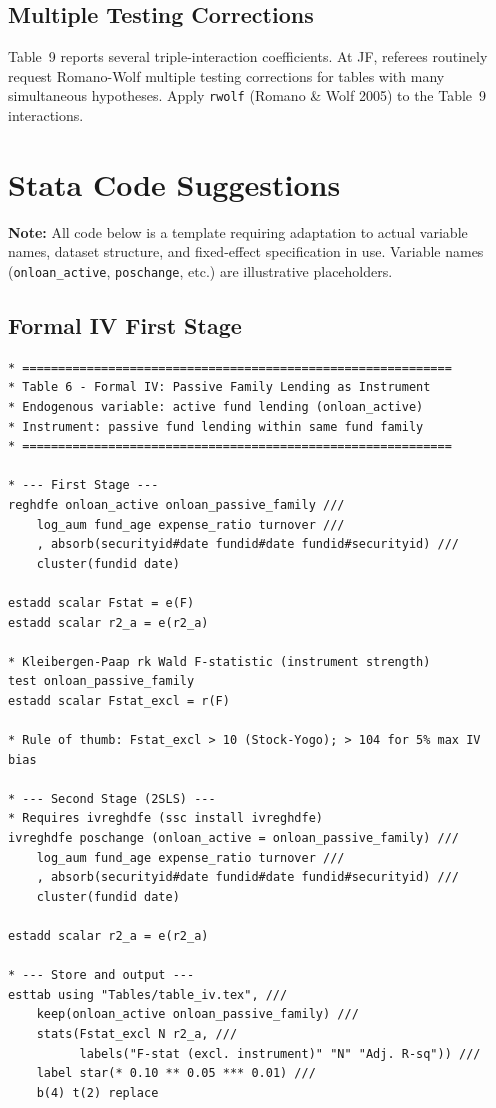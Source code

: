 \documentclass[11pt, a4paper]{article}
\begin{document}
\subsection{Multiple Testing Corrections}

Table~9 reports several triple-interaction coefficients. At JF, referees routinely request
Romano-Wolf multiple testing corrections for tables with many simultaneous hypotheses. Apply
\texttt{rwolf} (Romano \& Wolf 2005) to the Table~9 interactions.

\section{Stata Code Suggestions}

\textbf{Note:} All code below is a template requiring adaptation to actual variable names,
dataset structure, and fixed-effect specification in use. Variable names (\texttt{onloan\_active},
\texttt{poschange}, etc.) are illustrative placeholders.

\subsection{Formal IV First Stage}\label{sec:stata-iv}

\begin{lstlisting}[language={}]
* ============================================================
* Table 6 - Formal IV: Passive Family Lending as Instrument
* Endogenous variable: active fund lending (onloan_active)
* Instrument: passive fund lending within same fund family
* ============================================================

* --- First Stage ---
reghdfe onloan_active onloan_passive_family ///
    log_aum fund_age expense_ratio turnover ///
    , absorb(securityid#date fundid#date fundid#securityid) ///
    cluster(fundid date)

estadd scalar Fstat = e(F)
estadd scalar r2_a = e(r2_a)

* Kleibergen-Paap rk Wald F-statistic (instrument strength)
test onloan_passive_family
estadd scalar Fstat_excl = r(F)

* Rule of thumb: Fstat_excl > 10 (Stock-Yogo); > 104 for 5% max IV bias

* --- Second Stage (2SLS) ---
* Requires ivreghdfe (ssc install ivreghdfe)
ivreghdfe poschange (onloan_active = onloan_passive_family) ///
    log_aum fund_age expense_ratio turnover ///
    , absorb(securityid#date fundid#date fundid#securityid) ///
    cluster(fundid date)

estadd scalar r2_a = e(r2_a)

* --- Store and output ---
esttab using "Tables/table_iv.tex", ///
    keep(onloan_active onloan_passive_family) ///
    stats(Fstat_excl N r2_a, ///
          labels("F-stat (excl. instrument)" "N" "Adj. R-sq")) ///
    label star(* 0.10 ** 0.05 *** 0.01) ///
    b(4) t(2) replace
\end{lstlisting}
\end{document}
